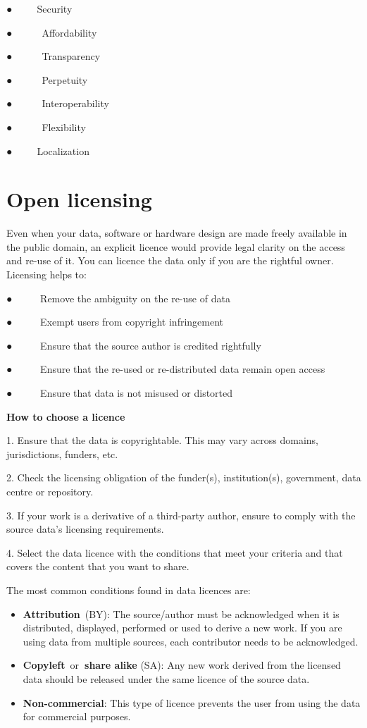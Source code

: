\documentclass[
]{book}
\providecommand{\tightlist}{%
  \setlength{\itemsep}{0pt}\setlength{\parskip}{0pt}}
\begin{document}
● ~ ~ ~Security

● ~ ~ ~~Affordability

● ~ ~ ~~Transparency

● ~ ~ ~~Perpetuity

● ~ ~ ~~Interoperability

● ~ ~ ~~Flexibility

● ~ ~ ~Localization

\hypertarget{open-licensing}{%
\section{Open licensing}\label{open-licensing}}

Even when your data, software or hardware design are made freely available in the public domain, an explicit licence would provide legal clarity on the access and re-use of it. You can licence the data only if you are the rightful owner. Licensing helps to:

● ~ ~ ~ Remove the ambiguity on the re-use of data

● ~ ~ ~ Exempt users from copyright infringement

● ~ ~ ~ Ensure that the source author is credited rightfully

● ~ ~ ~ Ensure that the re-used or re-distributed data remain open access

● ~ ~ ~ Ensure that data is not misused or distorted

\textbf{How to choose a licence}

1. Ensure that the data is copyrightable. This may vary across domains, jurisdictions, funders, etc.

2. Check the licensing obligation of the funder(s), institution(s), government, data centre or repository.

3. If your work is a derivative of a third-party author, ensure to comply with the source data's licensing requirements.

4. Select the data licence with the conditions that meet your criteria and that covers the content that you want to share.

The most common conditions found in data licences are:

\begin{itemize}
\tightlist
\item
  \textbf{Attribution}~(BY): The source/author must be acknowledged when it is distributed, displayed, performed or used to derive a new work. If you are using data from multiple sources, each contributor needs to be acknowledged.
\item
  \textbf{Copyleft}~or\textbf{~share alike} (SA): Any new work derived from the licensed data should be released under the same licence of the source data.
\item
  \textbf{Non-commercial}: This type of licence prevents the user from using the data for commercial purposes.
\end{itemize}
\end{document}
